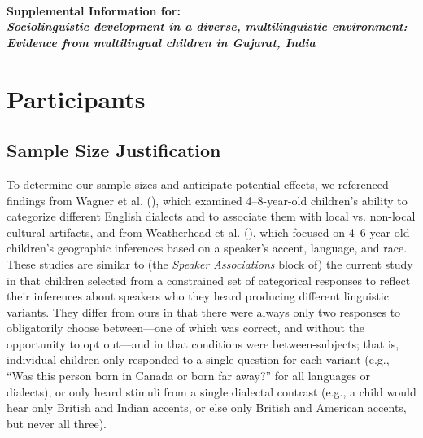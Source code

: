 \documentclass[11pt, floatsintext]{article}
\begin{document}
\thispagestyle{empty}

\begin{center}
{\hfill}\\
\vspace{20pt}
    \textbf{\large Supplemental Information for:\\ \textit{Sociolinguistic development in a diverse, multilinguistic environment: Evidence from multilingual children in Gujarat, India}}
\end{center}
\vspace{20pt}

\section*{Participants}

\pagebreak
\subsection*{Sample Size Justification}
To determine our sample sizes and anticipate potential effects, we referenced findings from Wagner et al. (\citeyear{wagner2014children}), which examined 4--8-year-old children's ability to categorize different English dialects and to associate them with local vs. non-local cultural artifacts, and from 
Weatherhead et al. (\cite{weatherhead2018accent}), which focused on 4--6-year-old children's geographic inferences based on a speaker's accent, language, and race. 
These studies are similar to (the \textit{Speaker Associations} block of) the current study in that children selected from a constrained set of categorical responses to reflect their inferences about speakers who they heard producing different linguistic variants. 
They differ from ours in that there were always only two responses to obligatorily choose between---one of which was correct, and without the opportunity to opt out---and in that conditions were between-subjects; that is, individual children only responded to a single question for each variant (e.g., ``Was this person born in Canada or born far away?'' for all languages or dialects), or only heard stimuli from a single dialectal contrast (e.g., a child would hear only British and Indian accents, or else only British and American accents, but never all three). 
\end{document}
